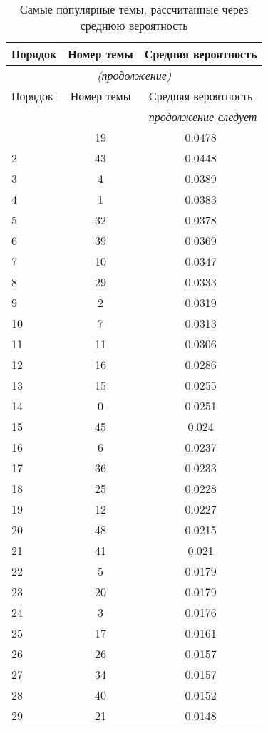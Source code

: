 \begin{longtable}[c]{|l|c|c|}
	\caption{Самые популярные темы, рассчитанные через среднюю вероятность}\label{table:popular_topics_2} 
	\\ 
	\hline
	Порядок & Номер темы & Средняя вероятность \\ \hline
	\endfirsthead   \hline
	\multicolumn{3}{|c|}{\small\slshape (продолжение)}        \\ \hline
	Порядок & Номер темы & Средняя вероятность \\ \hline
	\endhead        \hline
	\multicolumn{3}{|r|}{\small\slshape продолжение следует}  \\ \hline
	\endfoot        \hline
	\endlastfoot
		1 & 19 & 0.0478 \\
		2 & 43 & 0.0448 \\
		3 & 4 & 0.0389 \\
		4 & 1 & 0.0383 \\
		5 & 32 & 0.0378 \\
		6 & 39 & 0.0369 \\
		7 & 10 & 0.0347 \\
		8 & 29 & 0.0333 \\
		9 & 2 & 0.0319 \\
		10 & 7 & 0.0313 \\
		11 & 11 & 0.0306 \\
		12 & 16 & 0.0286 \\
		13 & 15 & 0.0255 \\
		14 & 0 & 0.0251 \\
		15 & 45 & 0.024 \\
		16 & 6 & 0.0237 \\
		17 & 36 & 0.0233 \\
		18 & 25 & 0.0228 \\
		19 & 12 & 0.0227 \\
		20 & 48 & 0.0215 \\
		21 & 41 & 0.021 \\
		22 & 5 & 0.0179 \\
		23 & 20 & 0.0179 \\
		24 & 3 & 0.0176 \\
		25 & 17 & 0.0161 \\
		26 & 26 & 0.0157 \\
		27 & 34 & 0.0157 \\
		28 & 40 & 0.0152 \\
		29 & 21 & 0.0148 \\

\end{longtable}

